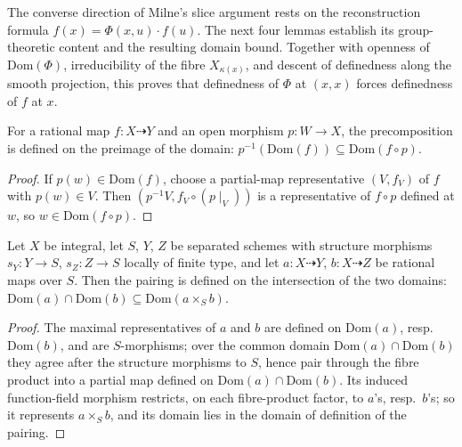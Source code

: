 The converse direction of Milne's slice argument rests on the reconstruction formula
\(f(x) = \Phi(x,u) \cdot f(u)\). The next four lemmas establish its group-theoretic
content and the resulting domain bound.  Together with openness of
\(\mathrm{Dom}(\Phi)\), irreducibility of the fibre \(X_{\kappa(x)}\), and descent of
definedness along the smooth projection, this proves that definedness of \(\Phi\) at
\((x,x)\) forces definedness of \(f\) at \(x\).

\begin{lemma}\leanok
  \label{lem:rationalMap_precomp_domain_bound}
  For a rational map \(f \colon X \dashrightarrow Y\) and an open morphism
  \(p \colon W \to X\), the precomposition is defined on the preimage of the domain:
  \(p^{-1}(\mathrm{Dom}(f)) \subseteq \mathrm{Dom}(f \circ p)\).
\end{lemma}
\begin{proof}\leanok
  If \(p(w) \in \mathrm{Dom}(f)\), choose a partial-map representative \((V, f_V)\) of
  \(f\) with \(p(w) \in V\). Then \((p^{-1}V, f_V \circ (p \mid_V))\) is a representative
  of \(f \circ p\) defined at \(w\), so \(w \in \mathrm{Dom}(f \circ p)\).
\end{proof}

\begin{lemma}\leanok
  \label{lem:rationalMap_prod_domain_bound}
  Let \(X\) be integral, let \(S\), \(Y\), \(Z\) be separated schemes with structure
  morphisms \(s_Y \colon Y \to S\), \(s_Z \colon Z \to S\) locally of finite type, and let
  \(a \colon X \dashrightarrow Y\), \(b \colon X \dashrightarrow Z\) be rational maps over
  \(S\). Then the pairing is defined on the intersection of the two domains:
  \(\mathrm{Dom}(a) \cap \mathrm{Dom}(b) \subseteq \mathrm{Dom}(a \times_S b)\).
\end{lemma}
\begin{proof}\leanok
  The maximal representatives of \(a\) and \(b\) are defined on \(\mathrm{Dom}(a)\),
  resp.\ \(\mathrm{Dom}(b)\), and are \(S\)-morphisms; over the common domain
  \(\mathrm{Dom}(a) \cap \mathrm{Dom}(b)\) they agree after the structure morphisms to
  \(S\), hence pair through the fibre product into a partial map defined on
  \(\mathrm{Dom}(a) \cap \mathrm{Dom}(b)\). Its induced function-field morphism restricts,
  on each fibre-product factor, to \(a\)'s, resp.\ \(b\)'s; so it represents \(a \times_S
  b\), and its domain lies in the domain of definition of the pairing.
\end{proof}

